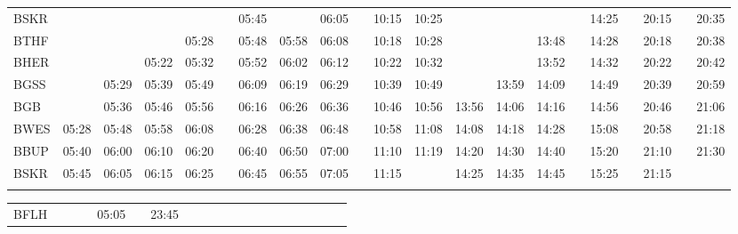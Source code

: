 \begin{center}
\begin{tabular}
\begin{tabular}
\begin{tabular}{!{\color{lightbrown}\vrule width 3pt}l!{\color{lightbrown}\vrule width 3pt}*{19}{c|}c!{\color{lightbrown}\vrule width 3pt}}
\hline
{}
 \\
\hline
BSKR            & 
      &       &       &       &          & 05:45 &       & 06:05 &  & 10:15 & 10:25 &       &       &       &          & 14:25 &  & 20:15 &  & 20:35 \\
BTHF            & 
      &       &       & 05:28 &  & 05:48 & 05:58 & 06:08 & \lbr{}   & 10:18 & 10:28 &       &       & 13:48 &  & 14:28 & \lbr{}   & 20:18 & \lbr{}   & 20:38 \\
BHER            & 
      &       & 05:22 & 05:32 & \lbr{}   & 05:52 & 06:02 & 06:12 & \lbr{}   & 10:22 & 10:32 &       &       & 13:52 & \lbr{}   & 14:32 & \lbr{}   & 20:22 & \lbr{}   & 20:42 \\
BGSS            & 
      & 05:29 & 05:39 & 05:49 & \lbr{}   & 06:09 & 06:19 & 06:29 & \lbr{}   & 10:39 & 10:49 &       & 13:59 & 14:09 & \lbr{}   & 14:49 & \lbr{}   & 20:39 & \lbr{}   & 20:59 \\
BGB             & 
      & 05:36 & 05:46 & 05:56 & \lbr{}   & 06:16 & 06:26 & 06:36 & \lbr{}   & 10:46 & 10:56 & 13:56 & 14:06 & 14:16 & \lbr{}   & 14:56 & \lbr{}   & 20:46 & \lbr{}   & 21:06 \\
BWES            & 
05:28 & 05:48 & 05:58 & 06:08 & \lbr{}   & 06:28 & 06:38 & 06:48 & \lbr{}   & 10:58 & 11:08 & 14:08 & 14:18 & 14:28 & \lbr{}   & 15:08 & \lbr{}   & 20:58 & \lbr{}   & 21:18 \\
BBUP            & 
05:40 & 06:00 & 06:10 & 06:20 & \lbr{}   & 06:40 & 06:50 & 07:00 & \lbr{}   & 11:10 & 11:19 & 14:20 & 14:30 & 14:40 & \lbr{}   & 15:20 & \lbr{}   & 21:10 & \lbr{}   & 21:30 \\
BSKR            & 
05:45 & 06:05 & 06:15 & 06:25 & \lbr{}   & 06:45 & 06:55 & 07:05 & \lbr{}   & 11:15 &       & 14:25 & 14:35 & 14:45 & \lbr{}   & 15:25 & \lbr{}   & 21:15 &          &       \\
\myhline
\end{tabular}
\fi
\fi
\ifulrich
\begin{tabular}{!{\color{mbrown}\vrule width 3pt}l!{\color{mbrown}\vrule width 3pt}*{5}{c|}c!{\color{mbrown}\vrule width 3pt}
*{6}{c|}c!{\color{mbrown}\vrule width 3pt}*{5}{c|}c!{\color{mbrown}\vrule width 3pt}}
\hline
{}
 &  &  \\
\hline
BFLH            & 
      &       &       & 05:05 &  & 23:45 &

\end{tabular}
\end{tabular}
\end{tabular}
\end{center}
